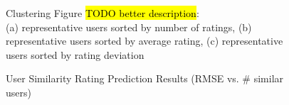 \begin{figure}
{\begin{tabular}{ c c c}
\end{tabular}
}
\caption{Clustering Figure \hl{TODO better description}: 
\\(a) representative users sorted by number of ratings, (b) representative users sorted by average rating, (c) representative users sorted by rating deviation}
\label{fig:ndcg}  
\end{figure}


\begin{figure}
\center
{}
\caption{User Similarity Rating Prediction Results (RMSE vs. \# similar users)}
\label{fig:user_similarity}  
\end{figure}




